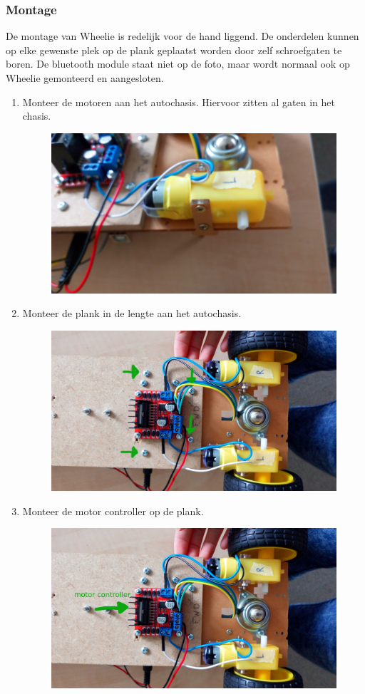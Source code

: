 \documentclass[12pt,a4paper]{article}
\begin{document}
\subsubsection{Montage}
De montage van Wheelie is redelijk voor de hand liggend. De onderdelen kunnen op elke gewenste plek op de plank geplaatst worden door zelf schroefgaten te boren. De bluetooth module staat niet op de foto, maar wordt normaal ook op Wheelie gemonteerd en aangesloten.

\begin{enumerate}
	\item Monteer de motoren aan het autochasis. Hiervoor zitten al gaten in het chasis.
	\begin{figure}[H]
		\centering
		\includegraphics[width=0.7\linewidth]{vastzetten_motor}
		\label{fig:vastzetten_motor}
	\end{figure}
	\item Monteer de plank in de lengte aan het autochasis.
	\begin{figure}[H]
		\centering
		\includegraphics[width=0.7\linewidth]{vastzetten_plank}
		\label{fig:vastzetten_plank}
	\end{figure}
	\item Monteer de motor controller op de plank. 
	\begin{figure}[H]
		\centering
		\includegraphics[width=0.7\linewidth]{vastzetten_motorcontroller}

\end{figure}
\end{enumerate}
\end{document}
